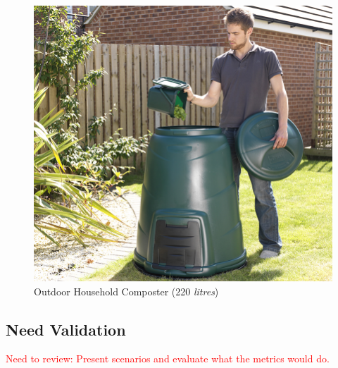\documentclass[a4paper,11pt,fleqn]{report}
\begin{document}
\begin{figure}[h!]
\begin{center}
\includegraphics[scale = 1.1]{Outdoor_Composter.jpg}
\caption{Outdoor Household Composter (220 \textit{litres})}
\label{fig: Outdoor Composter}
\end{center}
\end{figure}

\subsection{Need Validation}
\textcolor{red}{Need to review: Present scenarios and evaluate what the metrics would do.}\\
\end{document}
